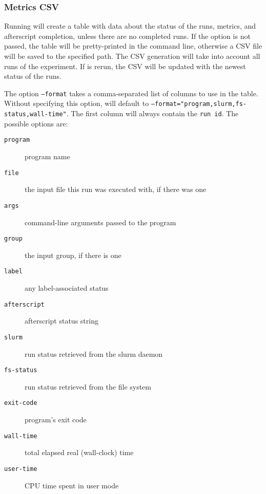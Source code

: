 \documentclass[a4paper,english]{article}
\begin{document}
\begin{adjustwidth}{18pt}{0pt}
            \subsubsection{Metrics CSV}
                Running    will create a table with
                data about the status of the runs, metrics, and afterscript completion, unless there
                are no completed runs.
                If the  option is not passed, the table will be pretty-printed in the 
                command line, otherwise a CSV file will be saved to the specified path.
                The CSV generation will take into account all runs of the experiment. If 
                 is rerun, the CSV will be updated with the newest status of the runs.

                The option \texttt{--format} takes a comma-separated list of columns to use
                in the table. Without specifying this option,  will default to
                \texttt{--format="program,slurm,fs-status,wall-time"}. The first column will 
                always contain the \texttt{run id}.
                The possible options are:
                \begin{description}
                    \item[\texttt{program}] program name
                    \item[\texttt{file}] the input file this run was executed with, if there was one
                    \item[\texttt{args}] command-line arguments passed to the program
                    \item[\texttt{group}] the input group, if there is one
                    \item[\texttt{label}] any label-associated status
                    \item[\texttt{afterscript}] afterscript status string
                    \item[\texttt{slurm}] run status retrieved from the slurm daemon
                    \item[\texttt{fs-status}] run status retrieved from the file system
                    \item[\texttt{exit-code}] program's exit code
                    \item[\texttt{wall-time}] total elapsed real (wall-clock) time
                    \item[\texttt{user-time}] CPU time spent in user mode

\end{description}
\end{adjustwidth}
\end{document}
